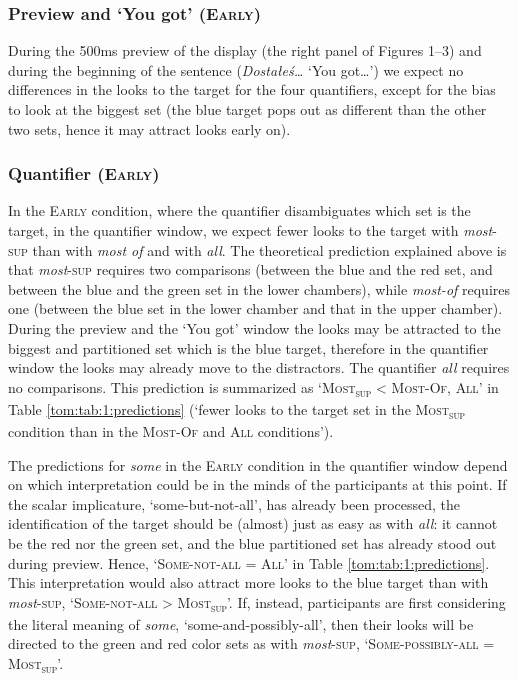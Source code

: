 \documentclass[output=paper]{langscibook}
\begin{document}

\subsubsection{Preview and `You got' (\textsc{Early})}

During the 500ms preview of the display (the right panel of Figures 1--3) and during the beginning of the sentence
(\textit{Dostałeś…} `You got…') we expect no differences in the looks to the target for the four quantifiers, except for the
bias to look at the biggest set (the blue target pops out as different than the other two sets, hence it may attract
looks early on).


\subsubsection{Quantifier (\textsc{Early})}

In the \textsc{Early} condition, where the quantifier disambiguates which set is the target, in the quantifier window, we expect
fewer looks to the target with \textit{most}\textsc{-sup} than with \textit{most of} and with \textit{all}. The
theoretical prediction explained above is that \textit{most}\textsc{-sup} requires two comparisons (between the blue
and the red set, and between the blue and the green set in the lower chambers), while \textit{most-of} requires one
(between the blue set in the lower chamber and that in the upper chamber). During the preview and the `You got' window
the looks may be attracted to the biggest and partitioned set which is the blue target, therefore in the quantifier
window the looks may already move to the distractors. The quantifier \textit{all} requires no comparisons. This prediction
is summarized as `\textsc{Most\textsubscript{sup}} {\textless} \textsc{Most-Of}, \textsc{All}' in Table \ref{tom:tab:1:predictions} (`fewer looks to the target set in the \textsc{Most\textsubscript{sup}} condition than in the \textsc{Most-Of} and \textsc{All} conditions').

The predictions for \textit{some} in the \textsc{Early} condition in the quantifier window depend on which interpretation could
be in the minds of the participants at this point. If the scalar implicature, `some-but-not-all', has already
been processed, the identification of the target should be (almost) just as easy as with \textit{all}: it cannot be the
red nor the green set, and the blue partitioned set has already stood out during preview. Hence, `\textsc{Some-not-all}
= \textsc{All}' in Table \ref{tom:tab:1:predictions}. This interpretation would also attract more looks to the blue target than with
\textit{most}\textsc{-sup}, `\textsc{Some-not-all} {\textgreater} \textsc{Most\textsubscript{sup}}'. If, instead,
participants are first considering the literal meaning of \textit{some}, `some-and-possibly-all', then their
looks will be directed to the green and red color sets as with \textit{most}\textsc{-sup},
`\textsc{Some-possibly-all} = \textsc{Most\textsubscript{sup}}'.
\end{document}
